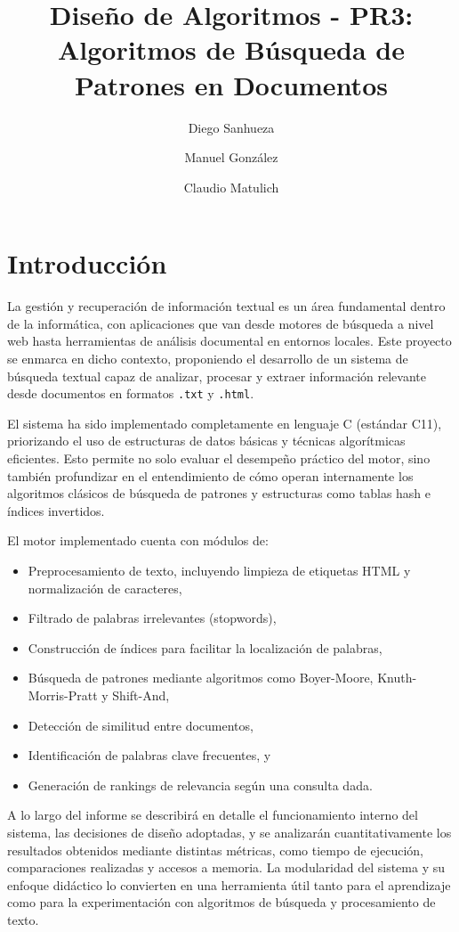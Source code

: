 \documentclass[9pt,letterpaper,onecolumn]{rho-class/rho}
\title{}
\author[$\dagger$]{Diego Sanhueza}
\author[$\dagger$]{Manuel González}
\author[$\dagger$]{Claudio Matulich}
\affil[$\dagger$]{Universidad de Magallanes}
\title{Diseño de Algoritmos - PR3: Algoritmos de Búsqueda de Patrones en Documentos}
\begin{document}
\maketitle
\thispagestyle{firststyle}
\tableofcontents

\section{Introducción}

La gestión y recuperación de información textual es un área fundamental dentro de la informática, con aplicaciones que van desde motores de búsqueda a nivel web hasta herramientas de análisis documental en entornos locales. Este proyecto se enmarca en dicho contexto, proponiendo el desarrollo de un sistema de búsqueda textual capaz de analizar, procesar y extraer información relevante desde documentos en formatos \texttt{.txt} y \texttt{.html}.

El sistema ha sido implementado completamente en lenguaje C (estándar C11), priorizando el uso de estructuras de datos básicas y técnicas algorítmicas eficientes. Esto permite no solo evaluar el desempeño práctico del motor, sino también profundizar en el entendimiento de cómo operan internamente los algoritmos clásicos de búsqueda de patrones y estructuras como tablas hash e índices invertidos.

El motor implementado cuenta con módulos de:
\begin{itemize}
    \item Preprocesamiento de texto, incluyendo limpieza de etiquetas HTML y normalización de caracteres,
    \item Filtrado de palabras irrelevantes (stopwords),
    \item Construcción de índices para facilitar la localización de palabras,
    \item Búsqueda de patrones mediante algoritmos como Boyer-Moore, Knuth-Morris-Pratt y Shift-And,
    \item Detección de similitud entre documentos,
    \item Identificación de palabras clave frecuentes, y
    \item Generación de rankings de relevancia según una consulta dada.
\end{itemize}

A lo largo del informe se describirá en detalle el funcionamiento interno del sistema, las decisiones de diseño adoptadas, y se analizarán cuantitativamente los resultados obtenidos mediante distintas métricas, como tiempo de ejecución, comparaciones realizadas y accesos a memoria. La modularidad del sistema y su enfoque didáctico lo convierten en una herramienta útil tanto para el aprendizaje como para la experimentación con algoritmos de búsqueda y procesamiento de texto.
\end{document}
